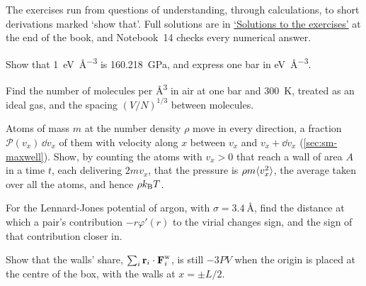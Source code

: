 \label{sec:pr-exercises}

The exercises run from questions of understanding, through calculations,
to short derivations marked `show that'. Full solutions are in
\hyperref[sec:pr-solutions]{`Solutions to the exercises'} at the end of
the book, and Notebook~14 checks every numerical answer.

\begin{exercise}
\label{ex:pr-units}
Show that \SI{1}{\electronvolt\per\angstrom\cubed} is
\SI{160.218}{\giga\pascal}, and express one bar in
\si{\electronvolt\per\angstrom\cubed}.
\end{exercise}

\begin{exercise}[air]
\label{ex:pr-air}
Find the number of molecules per \si{\angstrom\cubed} in air at one bar and
\SI{300}{\kelvin}, treated as an ideal gas, and the spacing $(V/N)^{1/3}$
between molecules.
\end{exercise}

\begin{exercise}
\label{ex:pr-flux}
Atoms of mass $m$ at the number density $\rho$ move in every direction, a
fraction $\mathcal{P}(v_x)\,\dd v_x$ of them with velocity along $x$
between $v_x$ and $v_x + \dd v_x$ (\cref{sec:sm-maxwell}). Show, by
counting the atoms with $v_x > 0$ that reach a wall of area $A$ in a time
$t$, each delivering $2mv_x$, that the pressure is $\rho m\langle v_x^2 \rangle$, the
average taken over all the atoms, and hence $\rho k_{\mathrm{B}} T$.
\end{exercise}

\begin{exercise}
\label{ex:pr-sign}
For the Lennard-Jones potential of argon, with $\sigma =
\SI{3.4}{\angstrom}$, find the distance at which a pair's contribution
$-r\varphi'(r)$ to the virial changes sign, and the sign of that
contribution closer in.
\end{exercise}

\begin{exercise}
\label{ex:pr-centre}
Show that the walls' share, $\sum_i\bm{\mathrm{r}}_i\cdot\bm{\mathrm{F}}^{\mathrm w}_i$, is
still $-3PV$ when the origin is placed at the centre of the box, with the
walls at $x = \pm L/2$.
\end{exercise}

